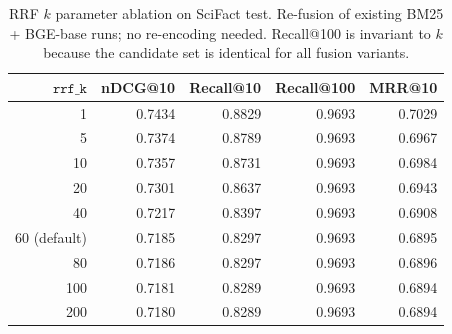 \begin{table}[htbp]
\centering
\caption{RRF $k$ parameter ablation on SciFact test. Re-fusion of existing BM25 + BGE-base runs; no re-encoding needed. Recall@100 is invariant to $k$ because the candidate set is identical for all fusion variants.}
\label{tab:rrf-ablation}
\begin{tabular}{rrrrr}
\toprule
$\texttt{rrf\_k}$ & nDCG@10 & Recall@10 & Recall@100 & MRR@10 \\
\midrule
1            & 0.7434 & 0.8829 & 0.9693 & 0.7029 \\
5            & 0.7374 & 0.8789 & 0.9693 & 0.6967 \\
10           & 0.7357 & 0.8731 & 0.9693 & 0.6984 \\
20           & 0.7301 & 0.8637 & 0.9693 & 0.6943 \\
40           & 0.7217 & 0.8397 & 0.9693 & 0.6908 \\
60 (default) & 0.7185 & 0.8297 & 0.9693 & 0.6895 \\
80           & 0.7186 & 0.8297 & 0.9693 & 0.6896 \\
100          & 0.7181 & 0.8289 & 0.9693 & 0.6894 \\
200          & 0.7180 & 0.8289 & 0.9693 & 0.6894 \\
\bottomrule
\end{tabular}
\end{table}

